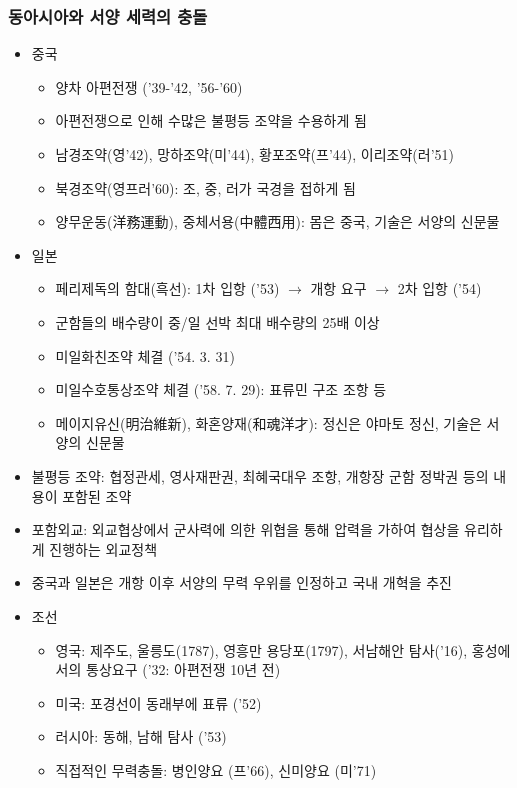 \subsubsection*{동아시아와 서양 세력의 충돌}
\begin{itemize}
    \item 중국
    \begin{itemize}
        \item 양차 아편전쟁 ('39-'42, '56-'60)
        \item 아편전쟁으로 인해 수많은 불평등 조약을 수용하게 됨
        \item 남경조약(영'42), 망하조약(미'44), 황포조약(프'44), 이리조약(러'51)
        \item 북경조약(영프러'60): 조, 중, 러가 국경을 접하게 됨
        \item 양무운동(洋務運動), 중체서용(中體西用): 몸은 중국, 기술은 서양의 신문물
    \end{itemize}
    \newpage
    \item 일본
    \begin{itemize}
        \item 페리제독의 함대(흑선): 1차 입항 ('53) $\rightarrow$ 개항 요구 $\rightarrow$ 2차 입항 ('54)
        \item 군함들의 배수량이 중/일 선박 최대 배수량의 25배 이상
        \item 미일화친조약 체결 ('54. 3. 31)
        \item 미일수호통상조약 체결 ('58. 7. 29): 표류민 구조 조항 등
        \item 메이지유신(明治維新), 화혼양재(和魂洋才): 정신은 야마토 정신, 기술은 서양의 신문물
    \end{itemize}
    \item 불평등 조약: 협정관세, 영사재판권, 최혜국대우 조항, 개항장 군함 정박권 등의 내용이 포함된 조약
    \item 포함외교: 외교협상에서 군사력에 의한 위협을 통해 압력을 가하여 협상을 유리하게 진행하는 외교정책
    \item 중국과 일본은 개항 이후 서양의 무력 우위를 인정하고 국내 개혁을 추진
    \item 조선
    \begin{itemize}
        \item 영국: 제주도, 울릉도(1787), 영흥만 용당포(1797), 서남해안 탐사('16), 홍성에서의 통상요구 ('32: 아편전쟁 10년 전)
        \item 미국: 포경선이 동래부에 표류 ('52)
        \item 러시아: 동해, 남해 탐사 ('53)
        \item 직접적인 무력충돌: 병인양요 (프'66), 신미양요 (미'71)
    \end{itemize}
\end{itemize}

